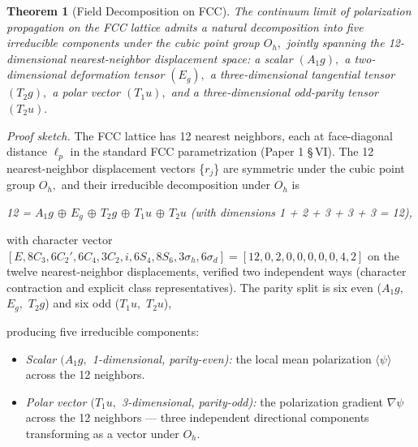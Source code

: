 \documentclass[11pt,oneside]{report}
\newtheorem{theorem}{Theorem}[section]
\theoremstyle{definition}
\theoremstyle{remark}
\begin{document}
\begin{theorem}[Field Decomposition on FCC]
The continuum limit
of polarization propagation on the FCC lattice admits a natural
decomposition into five irreducible components under the cubic point
group \ensuremath{O_{h},} jointly spanning the 12-dimensional nearest-neighbor
displacement space: a scalar \ensuremath{(A_{1}g),} a two-dimensional deformation
tensor \ensuremath{(E_{g}),} a three-dimensional tangential tensor \ensuremath{(T_{2}g),} a polar
vector \ensuremath{(T_{1}u),} and a three-dimensional odd-parity tensor \ensuremath{(T_{2}u).}
\end{theorem}

\emph{Proof sketch.} The FCC lattice has 12 nearest neighbors, each at
face-diagonal distance \ensuremath{\ell_{p}} in the standard FCC parametrization (Paper 1
\S\,VI). The 12 nearest-neighbor displacement vectors \{\ensuremath{r_{j}}\} are symmetric
under the cubic point group \ensuremath{O_{h},} and their irreducible decomposition
under \ensuremath{O_{h}} is

\emph{12 = \ensuremath{A_{1}g} \ensuremath{\oplus} \ensuremath{E_{g}} \ensuremath{\oplus} \ensuremath{T_{2}g} \ensuremath{\oplus} \ensuremath{T_{1}u} \ensuremath{\oplus} \ensuremath{T_{2}u} (with dimensions 1 + 2 + 3 + 3 +
3 = 12),}

with character vector \ensuremath{[E, 8C_3, 6C_2', 6C_4, 3C_2, i, 6S_4, 8S_6, 3\sigma_h, 6\sigma_d] = [12, 0, 2, 0, 0, 0, 0, 0, 4, 2]} on the twelve nearest-neighbor displacements, verified two independent ways (character contraction and explicit class representatives). The parity split is six even (\ensuremath{A_{1}g,} \ensuremath{E_{g},} \ensuremath{T_{2}g}) and six odd (\ensuremath{T_{1}u,} \ensuremath{T_{2}u}),

producing five irreducible components:

\begin{itemize}
\item
  \emph{Scalar \ensuremath{(A_{1}g,} 1-dimensional, parity-even):} the local mean
  polarization \ensuremath{\langle \psi \rangle} across the 12 neighbors.
\end{itemize}

\begin{itemize}
\item
  \emph{Polar vector \ensuremath{(T_{1}u,} 3-dimensional, parity-odd):} the polarization
  gradient \ensuremath{\nabla \psi} across the 12 neighbors --- three independent directional
  components transforming as a vector under \ensuremath{O_{h}.}
\end{itemize}
\end{document}
